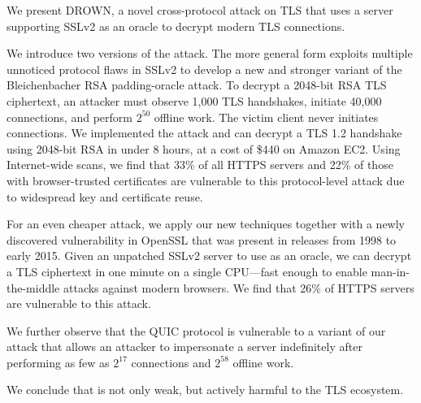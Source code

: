 We present DROWN, a novel cross-protocol attack on TLS that
uses a server supporting SSLv2 as an oracle to decrypt modern TLS connections.

We introduce two versions of the
attack. The more general form exploits multiple unnoticed protocol flaws in
SSLv2 to develop a new and stronger variant of the Bleichenbacher RSA
padding-oracle attack.  To decrypt a 2048-bit RSA TLS ciphertext, an attacker
must observe 1,000 TLS handshakes, initiate 40,000 \ssltwo connections, and
perform $2^{50}$ offline work. The victim client never initiates \ssltwo
connections. We implemented the attack and can decrypt a TLS 1.2 handshake using
2048-bit RSA in under 8 hours, at a cost of \$440 on Amazon EC2\@. Using
Internet-wide scans, we find that 33\% of all HTTPS servers and 22\% of those
with browser-trusted certificates are vulnerable to this protocol-level attack
due to widespread key and certificate reuse.

For an even cheaper attack, we apply our new techniques together with a newly
discovered vulnerability in OpenSSL that was present in releases from 1998 to
early 2015.  Given an unpatched SSLv2 server to use as an oracle, we can
decrypt a TLS ciphertext in one minute on a single CPU---fast enough to enable
man-in-the-middle attacks against modern browsers. We find that 26\% of HTTPS servers are
vulnerable to this attack.

We further observe that the QUIC protocol is
vulnerable to a variant of our attack that allows an attacker to impersonate a
server indefinitely after performing as few as 
$2^{17}$ \ssltwo connections and $2^{58}$ offline work. %

We conclude that \ssltwo is not only weak, but actively harmful to the TLS ecosystem.

